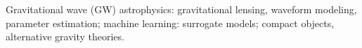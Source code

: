 Gravitational wave (GW) astrophysics: gravitational lensing, waveform modeling, parameter estimation; machine learning: surrogate models; compact objects, alternative gravity theories.